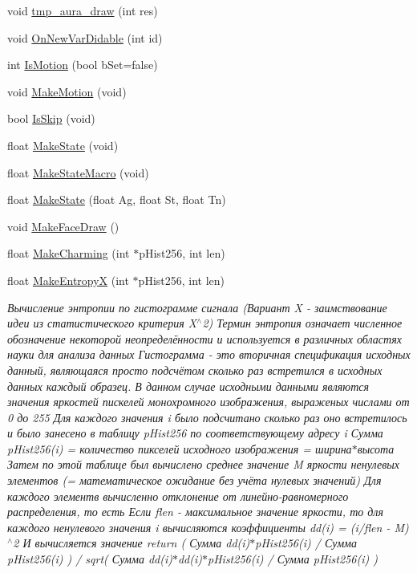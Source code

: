 \begin{DoxyCompactItemize}
void \hyperlink{class_c_v_i_engine_base_a9037ada333cb78e24b8178703c1bace4}{tmp\+\_\+aura\+\_\+draw} (int res)
\item 
void \hyperlink{class_c_v_i_engine_base_afb7d69a59c1067240f248d50d7172ba6}{On\+New\+Var\+Didable} (int id)
\item 
int \hyperlink{class_c_v_i_engine_base_ab9ac11fcc300832a72d0be60be3419e6}{Is\+Motion} (bool b\+Set=false)
\item 
void \hyperlink{class_c_v_i_engine_base_aa31de24bd1b50c4206e8c3a6603985b2}{Make\+Motion} (void)
\item 
bool \hyperlink{class_c_v_i_engine_base_a1bedb5c81d496c6c5496ba88cea82eb7}{Is\+Skip} (void)
\item 
float \hyperlink{class_c_v_i_engine_base_aa77b261660041465a8d3e68a7088dd0d}{Make\+State} (void)
\item 
float \hyperlink{class_c_v_i_engine_base_ab42744ae341c3653c24ae3fd38bc7ceb}{Make\+State\+Macro} (void)
\item 
float \hyperlink{class_c_v_i_engine_base_a835724aef2b6afbc88d5db31e8a13a08}{Make\+State} (float Ag, float St, float Tn)
\item 
void \hyperlink{class_c_v_i_engine_base_a18c5dc58d55a37295b3dd4c451fb86fc}{Make\+Face\+Draw} ()
\item 
float \hyperlink{class_c_v_i_engine_base_a784d5489bb89efa567e207d3539de0da}{Make\+Charming} (int $\ast$p\+Hist256, int len)
\item 
float \hyperlink{class_c_v_i_engine_base_a2617136f50ae63442e88809037ab9ff0}{Make\+Entropy\+X} (int $\ast$p\+Hist256, int len)
\begin{DoxyCompactList}\small\item\em Вычисление энтропии по гистограмме сигнала (Вариант X -\/ заимствование идеи из статистического критерия X$^\wedge$2) Термин энтропия означает численное обозначение некоторой неопределённости и используется в различных областях науки для анализа данных Гистограмма -\/ это вторичная спецификация исходных данный, являющаяся просто подсчётом сколько раз встретился в исходных данных каждый образец. В данном случае исходными данными являются значения яркостей пискелей монохромного изображения, выраженых числами от 0 до 255 Для каждого значения i было подсчитано сколько раз оно встретилось и было занесено в таблицу p\+Hist256 по соответствующему адресу i Сумма p\+Hist256(i) = количество пикселей исходного изображения = ширина$\ast$высота Затем по этой таблице был вычислено среднее значение M яркости ненулевых элементов (= математическое ожидание без учёта нулевых значений) Для каждого элементв вычисленно отклонение от линейно-\/равномерного распределения, то есть Если flen -\/ максимальное значение яркости, то для каждого ненулевого значения i вычисляются коэффициенты dd(i) = (i/flen -\/ M)$^\wedge$2 И вычисляется значение return ( Сумма dd(i)$\ast$p\+Hist256(i) / Сумма p\+Hist256(i) ) / sqrt( Сумма dd(i)$\ast$dd(i)$\ast$p\+Hist256(i) / Сумма p\+Hist256(i) ) \end{DoxyCompactList}\item 

\end{DoxyCompactItemize}
